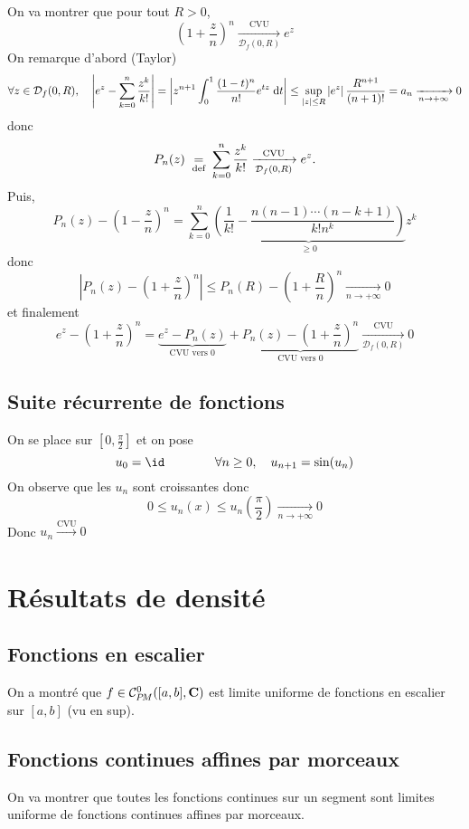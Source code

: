 On va montrer que pour tout $R>0$,  \[
    \left( 1+\frac{z}{n} \right) ^n \xrightarrow[\displaystyle\mathcal  D_f(0, R)]{\text{CVU}}e^z
\] 
On remarque d'abord (Taylor) \[
    \forall  z \in  \mathcal  D_f(0, R), \quad  \left| e^z- \sum_{k=0}^{n} \frac{z^k}{k!} \right| = \left| z^{n+1}\int_0^1 \frac{(1-t)^n}{n!}e^{tz}\;\mathrm{d} t \right| \leq \sup_{|z|\leq R} \left|e^z\right| \frac{R^{n+1}}{(n+1)!}=a_n \xrightarrow[n\to+\infty]{}0
\] 
donc \[
    P_n(z)\;\underset{\text{def}}=\; \sum_{k=0}^{n} \frac{z^k}{k!} \xrightarrow[\mathcal  D_f(0, R)]{\text{CVU}} e^z.
\]
Puis, \[
    P_n(z)-\left( 1-\frac{z}{n} \right) ^n= \sum_{k=0}^{n} \underbrace{\left( \frac{1}{k!}-\frac{n(n-1)\cdots (n-k+1)}{k!n^k} \right) }_{\geq 0}z^k
\] 
donc \[
    \left| P_n(z)- \left( 1+\frac{z}{n} \right) ^n \right| \leq P_n(R)- \left( 1+\frac{R}{n} \right) ^n \xrightarrow[n\to+\infty]{}0
\] 
et finalement \[
    e^z-\left( 1+\frac{z}{n} \right) ^n= \underbrace{e^z-P_n(z)}_{\text{CVU vers } 0}+\underbrace{P_n(z)-\left( 1+\frac{z}{n} \right) ^n}_{\text{CVU vers }0} \xrightarrow[\mathcal D_f(0, R)]{\text{CVU}}0
\] 

\subsection{Suite récurrente de fonctions}

On se place sur $[0, \frac{\pi}{2}]$ et on pose \[
    u_0=\id \qquad  \qquad  \forall  n\geq 0, \quad  u_{n+1}=\sin(u_n)
\] 
On observe que les $u_n$ sont croissantes donc  \[
    0\leq u_n(x)\leq u_n\left( \frac{\pi }{2} \right) \xrightarrow[n\to+\infty]{}0
\] 
Donc $u_n \xrightarrow[]{\text{CVU}}0$ 

\section{Résultats de densité}

\subsection{Fonctions en escalier}

On a montré que $f \in  \CPM([a, b], \C)$ est limite uniforme de fonctions en escalier sur $[a, b]$ (vu en sup).

\subsection{Fonctions continues affines par morceaux}

On va montrer que toutes les fonctions continues sur un segment sont limites uniforme de fonctions continues affines par morceaux.

